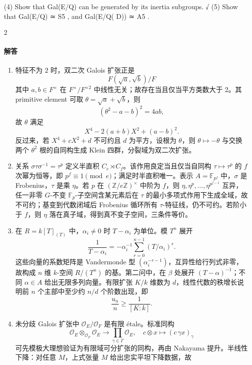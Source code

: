 \documentclass[UTF8,12pt]{ctexart}
\begin{document}
(4) Show that Gal(E/Q) can be generated by its inertia subgroups. √ (5) Show that Gal(E/Q) ≃ S5 , and Gal(E/Q( D)) ≃ A5 .

2

\paragraph{解答}
\begin{enumerate}[label=\textbf{\arabic*.},leftmargin=2.2em]
\item 特征不为 \(2\) 时，双二次 Galois 扩张正是
\[
F(\sqrt a,\sqrt b)/F
\]
其中 \(a,b\in F^\times\) 在 \(F^\times/F^{\times2}\) 中线性无关；故存在当且仅当平方类数大于 \(2\)。其 primitive element 可取 \(\theta=\sqrt a+\sqrt b\)，则
\[
(\theta^2-a-b)^2=4ab,
\]
故 \(\theta\) 满足
\[
X^4-2(a+b)X^2+(a-b)^2.
\]
反过来，若 \(X^4+cX^2+d\) 不可约且 \(d\) 为平方，设根为 \(\theta\)，则 \(\theta\mapsto-\theta\) 与交换两个 \(\theta^2\) 根的自同构生成 Klein 四群，分裂域为双二次扩张。
\item 关系 \(\sigma\tau\sigma^{-1}=\tau^p\) 定义半直积 \(C_e\rtimes C_f\)。该作用良定当且仅当自同构 \(\tau\mapsto\tau^p\) 的 \(f\) 次幂为恒等，即 \(p^f\equiv1\pmod e\)；满足时半直积唯一。表示 \(A=\mathbb F_{p^f}\) 中，\(\sigma\) 是 Frobenius，\(\tau\) 是乘 \(\eta\)。若 \(p\) 在 \((\mathbb Z/e\mathbb Z)^\times\) 中阶为 \(f\)，则 \(\eta,\eta^p,\ldots,\eta^{p^{f-1}}\) 互异，任一非零 \(G\)-不变 \(\mathbb F_p\)-子空间含某元素后在 \(\tau\) 的最小多项式作用下生成全域，故不可约；基变到代数闭域后 Frobenius 循环所有 \(\tau\)-特征线，仍不可约。若阶小于 \(f\)，则 \(\eta\) 落在真子域，得到真不变子空间，三条件等价。
\item 在 \(R=k[T]_{(T)}\) 中，\(\alpha_i\ne0\) 时 \(T-\alpha_i\) 为单位。模 \(T^n\) 展开
\[
\frac1{T-\alpha_i}=-\alpha_i^{-1}\sum_{r=0}^{n-1}(T/\alpha_i)^r .
\]
这些向量的系数矩阵是 Vandermonde 型 \((\alpha_i^{-r-1})\)，互异性给行列式非零，故构成 \(n\) 维 \(k\)-空间 \(R/(T^n)\) 的基。第二问中，在 \(\beta\) 处展开 \((T-\alpha)^{-1}\)；不同 \(\alpha\in A\) 给出无限多列向量。有限扩张 \(K/k\) 维数为 \(d\)，线性代数的秩增长说明前 \(n\) 个主部中至少约 \(n/d\) 个阶数出现，即
\[
\frac{u_n}{n}\ge \frac1{[K:k]}.
\]
\item 未分歧 Galois 扩张中 \(\mathcal O_E/\mathcal O_F\) 是有限 étale。标准同构
\[
\mathcal O_E\otimes_{\mathcal O_F}\mathcal O_E
\longrightarrow \prod_{\gamma\in\Gamma}\mathcal O_E,\quad
c\otimes x\mapsto (c\,\gamma x)_\gamma
\]
可先模极大理想验证为有限域可分扩张的同构，再由 Nakayama 提升。半线性下降：对任意 \(M\)，上式张量 \(M\) 给出忠实平坦下降数据，故
\[
\]
\end{enumerate}
\end{document}
